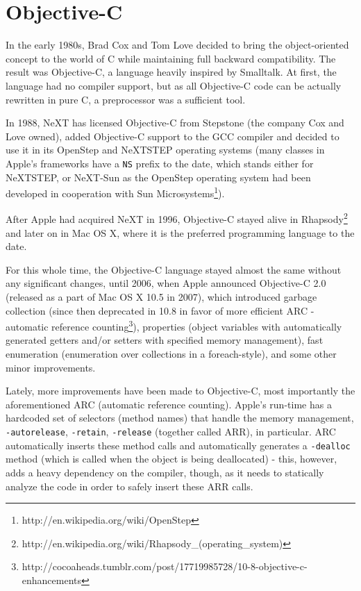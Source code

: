 \chapter{Objective-C}
  
In the early 1980s, Brad Cox and Tom Love decided to bring the object-oriented concept to the world of C while maintaining full backward compatibility. The result was Objective-C, a language heavily inspired by Smalltalk. At first, the language had no compiler support, but as all Objective-C code can be actually rewritten in pure C, a preprocessor was a sufficient tool.

In 1988, NeXT has licensed Objective-C from Stepstone (the company Cox and Love owned), added Objective-C support to the GCC compiler and decided to use it in its OpenStep and NeXTSTEP operating systems (many classes in Apple's frameworks have a \verb=NS= prefix to the date, which stands either for NeXTSTEP, or NeXT-Sun as the OpenStep operating system had been developed in cooperation with Sun Microsystems\footnote{http://en.wikipedia.org/wiki/OpenStep}).

After Apple had acquired NeXT in 1996, Objective-C stayed alive in Rhapsody\footnote{http://en.wikipedia.org/wiki/Rhapsody\_(operating\_system)} and later on in Mac OS X, where it is the preferred programming language to the date.

For this whole time, the Objective-C language stayed almost the same without any significant changes, until 2006, when Apple announced Objective-C 2.0 (released as a part of Mac OS X 10.5 in 2007), which introduced garbage collection (since then deprecated in 10.8 in favor of more efficient ARC - automatic reference counting\footnote{http://cocoaheads.tumblr.com/post/17719985728/10-8-objective-c-enhancements}), properties (object variables with automatically generated getters and/or setters with specified memory management), fast enumeration (enumeration over collections in a foreach-style), and some other minor improvements.

Lately, more improvements have been made to Objective-C, most importantly the aforementioned ARC (automatic reference counting). Apple's run-time has a hardcoded set of selectors (method names) that handle the memory management, \verb=-autorelease=, \verb=-retain=, \verb=-release= (together called ARR), in particular. ARC automatically inserts these method calls and automatically generates a \verb=-dealloc= method (which is called when the object is being deallocated) - this, however, adds a heavy dependency on the compiler, though, as it needs to statically analyze the code in order to safely insert these ARR calls.

